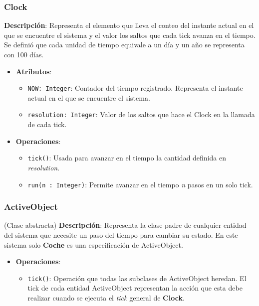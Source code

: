 \documentclass[12pt.a4paper]{article}
\begin{document}
\subsubsection{Clock}
\textbf{Descripción}:  
Representa el elemento que lleva el conteo del instante actual en el que se encuentre el sistema y el valor los saltos que cada tick avanza en el tiempo. Se definió que cada unidad de tiempo equivale a un día y un año se representa con 100 días.
\begin{itemize}
    \item \textbf{Atributos}:
    \begin{itemize}
        \item \texttt{NOW: Integer}: Contador del tiempo registrado. Representa el instante actual en el que se encuentre el sistema.
        \item \texttt{resolution: Integer}: Valor de los saltos que hace el Clock en la llamada de cada tick.
    \end{itemize}
    \item \textbf{Operaciones}:
    \begin{itemize}
        \item \texttt{tick()}: Usada para avanzar en el tiempo la cantidad definida en \emph{resolution}.
        \item \texttt{run(n : Integer)}: Permite avanzar en el tiempo \emph{n} pasos en un solo tick.
    \end{itemize}
\end{itemize}

\subsubsection{ActiveObject} (Clase abstracta)
\textbf{Descripción}:  
Representa la clase padre de cualquier entidad del sistema que necesite un paso del tiempo para cambiar su estado. En este sistema solo \textbf{Coche} es una especificación de ActiveObject.
\begin{itemize}
    \item \textbf{Operaciones}:
    \begin{itemize}
        \item \texttt{tick()}: Operación que todas las subclases de ActiveObject heredan. El tick de cada entidad ActiveObject representan la acción que esta debe realizar cuando se ejecuta el \emph{tick} general de \textbf{Clock}.
    \end{itemize}
\end{itemize}
\end{document}
